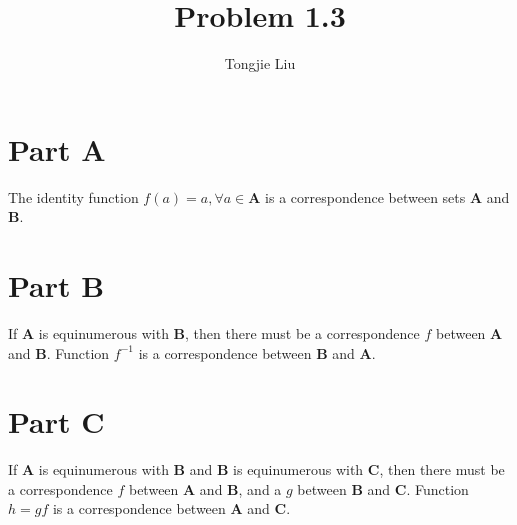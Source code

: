 \documentclass{article}
\title{Problem 1.3}
\author{Tongjie Liu}
\begin{document}
\maketitle


\section{Part A}
The identity function $f(a) = a, \forall a \in \mathbf{A}$ is a
correspondence between sets $\mathbf{A}$ and $\mathbf{B}$.


\section{Part B}
If $\mathbf{A}$ is equinumerous with $\mathbf{B}$, then there must
be a correspondence $f$ between $\mathbf{A}$ and $\mathbf{B}$. Function
$f^{-1}$ is a correspondence between $\mathbf{B}$ and $\mathbf{A}$.


\section{Part C}
If $\mathbf{A}$ is equinumerous with $\mathbf{B}$ and $\mathbf{B}$ is
equinumerous with $\mathbf{C}$, then there must be a correspondence
$f$ between $\mathbf{A}$ and $\mathbf{B}$, and a $g$ between $\mathbf{B}$
and $\mathbf{C}$. Function $h = gf$ is a correspondence between $\mathbf{A}$
and $\mathbf{C}$.
\end{document}

